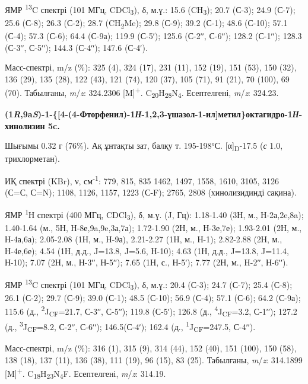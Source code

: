 \begin{multicols}{2}
ЯМР \textsuperscript{13}C спектрі (101 МГц, CDCl\textsubscript{3}), δ,
м.ү.: 15.6 (CH\textsubscript{3}); 20.7 (С-3); 24.9 (С-7); 25.6 (С-8);
26.3 (С-2); 28.7 (CH\textsubscript{2}Me); 29.8 (С-9); 39.2 (С-1); 48.6
(С-10); 57.1 (С-4); 57.3 (С-6); 64.4 (С-9а); 119.9 (С-5ʹ); 125.6 (С-2ʹʹ,
С-6ʹʹ); 128.2 (С-1ʹʹ); 128.3 (С-3ʹʹ, С-5ʹʹ); 144.3 (С-4ʹʹ); 147.6
(С-4ʹ).

Масс-спектрі, m/z (\%): 325 (4), 324 (17), 231 (11), 152 (19), 151 (53),
150 (32), 136 (29), 135 (28), 122 (43), 121 (74), 120 (37), 105 (71), 91
(21), 70 (100), 69 (70). Табылғаны, \emph{m}/\emph{z}: 324.2306
{[}M{]}\textsuperscript{+}.
C\textsubscript{20}H\textsubscript{28}N\textsubscript{4}. Есептелгені,
\emph{m}/\emph{z}: 324.23.

{\bfseries (1\emph{R},9a\emph{S})-1-\{{[}4-(4-Фторфенил)-1\emph{Н}-1,2,3-үшазол-1-ил{]}метил\}октагидро-1\emph{Н}-хинолизин
5c.}

Шығымы 0.32 г (76\%). Ақ ұнтақты зат, балқу т. 195-198°С.
{[}α{]}\textsubscript{D}-17.5 (\emph{с} 1.0, трихлорметан).

ИҚ спектрі (KBr), ν, см\textsuperscript{-1}: 779, 815, 835 1462, 1497,
1558, 1610, 3105, 3126 (С=С, С=N); 1108, 1126, 1157, 1223 (С-F); 2765,
2808 (хинолизидинді сақина).

ЯМР \textsuperscript{1}Н спектрі (400 МГц, CDCl\textsubscript{3}), δ,
м.ү. (J, Гц): 1.18-1.40 (3Н, м., Н-2а,2e,8a); 1.40-1.64 (м., 5Н,
Н-8е,9a,9e,3а,7а); 1.72-1.90 (2Н, м., Н-3е,7е); 1.93-2.01 (2Н, м.,
Н-4а,6а); 2.05-2.08 (1Н, м., Н-9а), 2.21-2.27 (1H, м., Н-1); 2.82-2.88
(2Н, м., Н-4е,6е); 4.54 (1Н, д.д., J=13.8, J=5.6, Н-10); 4.63 (1Н, д.д.,
J=13.8, J=11.4, Н-10); 7.07 (2Н, м., Н-3ʹʹ, Н-5ʹʹ); 7.65 (1Н, с., Н-5ʹ);
7.77 (2Н, м., H-2ʹʹ, Н-6ʹʹ).

ЯМР \textsuperscript{13}C спектрі (101 МГц, CDCl\textsubscript{3}), δ,
м.ү.: 20.4 (С-3); 24.7 (С-7); 25.4 (С-8); 26.1 (С-2); 29.7 (С-9); 39.0
(С-1); 48.5 (С-10); 56.9 (С-4); 57.1 (С-6); 64.2 (С-9а); 115.6 (д.,
\textsuperscript{2}J\textsubscript{CF}=21.7, С-3ʹʹ, С-5ʹʹ); 119.8
(С-5ʹ); 126.8 (д., \textsuperscript{4}J\textsubscript{CF}=3.2, С-1ʹʹ);
127.2 (д., \textsuperscript{3}J\textsubscript{CF}=8.2, С-2ʹʹ, С-6ʹʹ);
146.5(С-4ʹ); 162.4 (д., \textsuperscript{1}J\textsubscript{CF}=247.5,
С-4ʹʹ).

Масс-спектрі, m/z (\%): 316 (1), 315 (9), 314 (44), 152 (40), 151 (100),
150 (58), 138 (18), 137 (11), 136 (38), 111 (19), 96 (15), 83 (25).
Табылғаны, \emph{m}/\emph{z}: 314.1899 {[}M{]}\textsuperscript{+}.
C\textsubscript{18}H\textsubscript{23}N\textsubscript{4}F. Есептелгені,
\emph{m}/\emph{z}: 314.19.


\end{multicols}
